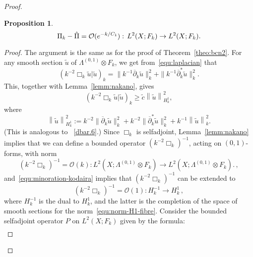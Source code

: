 \documentclass{article}
\newtheorem{prop}[theo]{Proposition}
\newcommand{\norm}[1]{\left\|#1\right\|}
\newcommand{\tnorm}[1]{\|#1\|}
\newcommand{\dbar}{\overline\partial}
\renewcommand{\O}{\mathcal{O}}
\newcommand{\pscal}[2]{\left(#1 | #2\right)}
\begin{document}
\begin{proof}
  \begin{prop}
    \label{prop:fibre3}
    \begin{equation}
      \label{equ:approximate-fibre}
      \Pi_k -\hat\Pi={\cal O}(e^{-k/C_1}):\,  L^2(X;F_k)\to
      L^2(X;F_k) .
    \end{equation}
  \end{prop}
  \begin{proof}
    The argument is the same as for the proof of
    Theorem~\ref{theo:bcn2}. For any smooth section $\tilde u$ of
    $\Lambda^{(0,1)}\otimes F_k$, we get from~\eqref{equ:laplacian}
    that
    \begin{equation}
      \label{equ:fibre-norme-box}
      \pscal{k^{-2}\Box_k \tilde u}{\tilde u}_k
      = \tnorm{k^{-1}\dbar_k \tilde u}_k^2
      + \tnorm{k^{-1}\dbar^*_k \tilde u}_k^2.
    \end{equation}
    This, together with Lemma~\ref{lemm:nakano}, gives
    \begin{equation}
      \label{equ:minoration-kodaira}
      \pscal{k^{-2}\Box_k \tilde u}{\tilde u}_k \geq 
      \tilde c  \norm{\tilde u}^2_{H^1_k},
    \end{equation}
    where
    \begin{equation}
      \label{equ:norm-H1-fibre}
      \norm{\tilde u}^2_{H^1_k} := k^{-2}\tnorm{\dbar_k \tilde u}_k^2
      + k^{-2}\tnorm{\dbar^*_k \tilde u}_k^2 + k^{-1}\norm{\tilde
        u}_k^2.
    \end{equation}
    (This is analogous to ~\eqref{dbar.6}.)  Since $\Box_k$ is
    selfadjoint, Lemma~\ref{lemm:nakano} implies that we can define a
    bounded operator $(k^{-2}\Box_k)^{-1}$, acting on $(0,1)$-forms,
    with norm
    \begin{equation}
      (k^{-2}\Box_k)^{-1} 
      = \O(k) : L^2(X;\Lambda^{(0,1)} \otimes F_k) \to
      L^2(X;\Lambda^{(0,1)} \otimes F_k).
      \label{equ:fibre-inverse-l2}\,,
    \end{equation}
    and~\eqref{equ:minoration-kodaira} implies that
    $(k^{-2}\Box_k)^{-1}$ can be extended to
    \begin{equation}
      (k^{-2}\Box_k)^{-1}   = \O(1) : H^{-1}_k \to H^1_k\,,
      \label{equ:fibre-inverse-h1}
    \end{equation}
    where $H^{-1}_k$ is the dual to $H^1_k$, and the latter is the
    completion of the space of smooth sections for the
    norm~\eqref{equ:norm-H1-fibre}.  Consider the bounded selfadjoint
    operator $P$ on $L^2(X;F_k)$ given by the formula:
    \begin{align}

\end{align}
\end{proof}
\end{proof}
\end{document}
